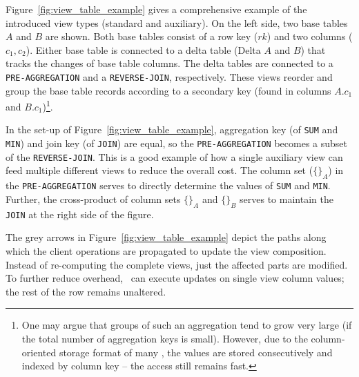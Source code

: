 Figure~\ref{fig:view_table_example} gives a comprehensive example of
the introduced view types (standard and auxiliary). On the left side,
two base tables $A$ and $B$ are shown. Both base tables consist of a
row key ($rk$) and two columns ($c_1, c_2$). Either base table is
connected to a delta table (Delta $A$ and $B$) that tracks the changes
of base table columns. The delta tables are connected to a
\texttt{PRE-AGGREGATION} and a \texttt{REVERSE-JOIN}, respectively.
These views reorder and group the base table records according to a
secondary key (found in columns $A.c_1$ and $B.c_1$)\footnote{One may argue
that groups of such an aggregation tend to grow very large (if
the total number of aggregation keys is small). However, due to the
column-oriented storage format of many \KVS, the values are stored
consecutively and indexed by column key -- the access still remains
fast.}.

%
%
In the set-up of Figure~\ref{fig:view_table_example}, aggregation key
(of \texttt{SUM} and \texttt{MIN}) and join key (of \texttt{JOIN}) are
equal, so the \texttt{PRE-AGGREGATION} becomes a subset of the
\texttt{REVERSE-JOIN}. This is a good example of how a single
auxiliary view can feed multiple different views to reduce the overall
cost. The column set ($\{\}_A$) in the \texttt{PRE-AGGREGATION} serves
to directly determine the values of \texttt{SUM} and
\texttt{MIN}. Further, the cross-product of column sets $\{\}_A$ and
$\{\}_B$ serves to maintain the \texttt{JOIN} at the right side of the
figure.

The grey arrows in Figure~\ref{fig:view_table_example} depict the
paths along which the client operations are propagated to update the
view composition.  Instead of re-computing the complete views, just
the affected parts are modified. To further reduce overhead, \VMS\ 
can execute updates on single view column values; the rest of the row 
remains unaltered. 

